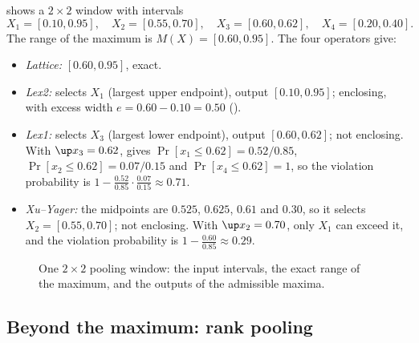  shows a $2\times2$ window with intervals
\[
X_1=[0.10,0.95],\quad X_2=[0.55,0.70],\quad X_3=[0.60,0.62],\quad X_4=[0.20,0.40].
\]
The range of the maximum is $M(X)=[0.60,0.95]$. The four operators give:
\begin{itemize}
\item \emph{Lattice:} $[0.60,0.95]$, exact.
\item \emph{Lex2:} selects $X_1$ (largest upper endpoint), output $[0.10,0.95]$; enclosing, with excess width $e=0.60-0.10=0.50$ ().
\item \emph{Lex1:} selects $X_3$ (largest lower endpoint), output $[0.60,0.62]$; not enclosing. With $\up x_3=0.62$,  gives $\Pr[x_1\le0.62]=0.52/0.85$, $\Pr[x_2\le0.62]=0.07/0.15$ and $\Pr[x_4\le0.62]=1$, so the violation probability is $1-\frac{0.52}{0.85}\cdot\frac{0.07}{0.15}\approx0.71$.
\item \emph{Xu--Yager:} the midpoints are $0.525$, $0.625$, $0.61$ and $0.30$, so it selects $X_2=[0.55,0.70]$; not enclosing. With $\up x_2=0.70$, only $X_1$ can exceed it, and the violation probability is $1-\frac{0.60}{0.85}\approx0.29$.
\end{itemize}

\begin{figure}[t]
\centering
{}
\caption{One $2\times2$ pooling window: the input intervals, the exact range of the maximum, and the outputs of the admissible maxima.}
\label{fig:window}
\end{figure}

\subsection{Beyond the maximum: rank pooling}


